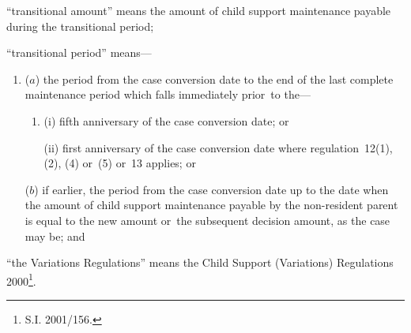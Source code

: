 \documentclass[12pt,a4paper]{article}
\begin{document}
\begin{enumerate}
“transitional amount” means the amount of child support maintenance payable during the transitional period;

“transitional period” means—
\begin{enumerate}\item[]
($a$) 
the period from the case conversion date to the end of the last complete maintenance period which falls immediately prior~to the—
\begin{enumerate}\item[]
(i) 
fifth anniversary of the case conversion date; or

(ii) 
first anniversary of the case conversion date where regulation~12(1), (2), (4) or~(5) or~13 applies; or
\end{enumerate}

($b$) 
if earlier, the period from the case conversion date up to the date when the amount of child support maintenance payable by the non-resident parent is equal to the new amount or~the subsequent decision amount, as the case may be; and
\end{enumerate}

“the Variations Regulations” means the Child Support (Variations) Regulations 2000\footnote{\frenchspacing S.I. 2001/156.}.
\end{enumerate}
\end{document}
